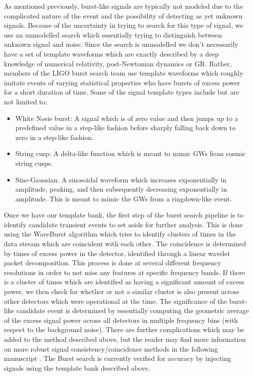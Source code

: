 As mentioned previously, burst-like signals are typically not modeled due to the complicated nature of the event and the possibility of detecting as yet unknown signals. Because of the uncertainty in trying to search for this type of signal, we use an unmodelled search which essentially trying to distinguish between unknown signal and noise. Since the search is unmodelled we don't necessarily have a set of template waveforms which are exactly described by a deep knowledge of numerical relativity, post-Newtonian dynamics or \ac{GR}. Rather, members of the \ac{LIGO} burst search team use template waveforms which roughly imitate events of varying statistical properties who have bursts of excess power for a short duration of time. Some of the signal template types include but are not limited to:

\begin{itemize}
    \item White Nosie burst: A signal which is of zero value and then jumps up to a predefined value in a step-like fashion before sharply falling back down to zero in a step-like fashion.
    \item String cusp: A delta-like function which is meant to mimic \ac{GW}s from cosmic string cusps.
    \item Sine-Gaussian: A sinosoidal waveform which increases exponentially in amplitude, peaking, and then subsequently decreasing exponentially in amplitude. This is meant to mimic the \ac{GW}s from a ringdown-like event.
\end{itemize}

%
%

Once we have our template bank, the first step of the burst search pipeline is to identify candidate transient events to set aside for further analysis. This is done using the WaveBurst algorithm which tries to identify clusters of times in the data stream which are coincident with each other. The coincidence is determined by times of excess power in the detector, identified through a linear wavelet packet decomposition. This process is done at several different frequency resolutions in order to not miss any features at specific frequency bands. If there is a cluster of times which are identified as having a significant amount of excess power, we then check for whether or not a similar cluster is also present across other detectors which were operational at the time. The significance of the burst-like candidate event is determined by essentially computing the geometric average of the excess signal power across all detectors in multiple frequency bins (with respect to the background noise). There are further complications which may be added to the method described above, but the reader may find more information on more robust signal consistency/coincidence methods in the following manuscript \cite{Abbott_2007}. The Burst search is currently verified for accuracy by injecting signals using the template bank described above.


